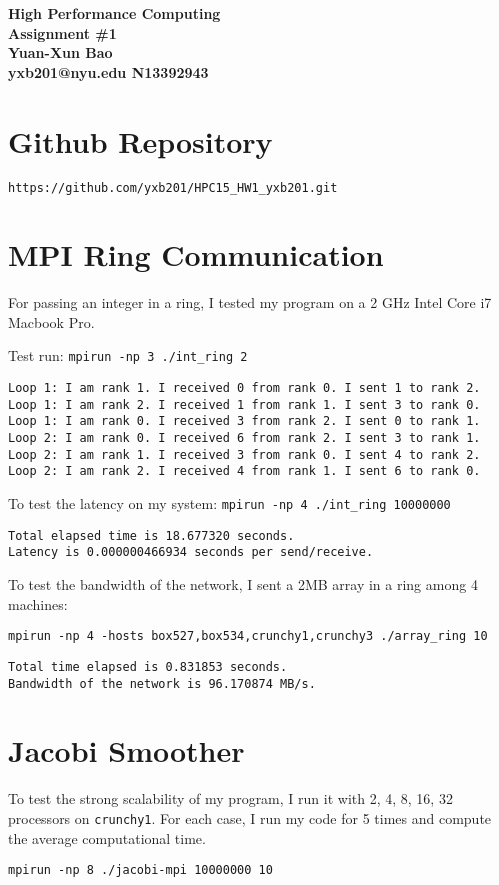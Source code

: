 \documentclass[12pt]{article}
\begin{document}
\begin{center}

\large \textbf{%
High Performance Computing \\ Assignment \#1  \\ Yuan-Xun Bao \\ yxb201@nyu.edu \quad N13392943}
\end{center}

\section{Github Repository}

\verb|https://github.com/yxb201/HPC15_HW1_yxb201.git|

\section{MPI Ring Communication}
For passing an integer in a ring, I tested my program on a 2 GHz Intel Core i7 Macbook Pro.

\noindent
Test run: \verb|mpirun -np 3 ./int_ring 2|

\begin{verbatim}
Loop 1: I am rank 1. I received 0 from rank 0. I sent 1 to rank 2.
Loop 1: I am rank 2. I received 1 from rank 1. I sent 3 to rank 0.
Loop 1: I am rank 0. I received 3 from rank 2. I sent 0 to rank 1.
Loop 2: I am rank 0. I received 6 from rank 2. I sent 3 to rank 1.
Loop 2: I am rank 1. I received 3 from rank 0. I sent 4 to rank 2.
Loop 2: I am rank 2. I received 4 from rank 1. I sent 6 to rank 0.
\end{verbatim}

\noindent
To test the latency on my system: \verb|mpirun -np 4 ./int_ring 10000000|

\begin{verbatim}
Total elapsed time is 18.677320 seconds.
Latency is 0.000000466934 seconds per send/receive.
\end{verbatim}

\noindent
To test the bandwidth of the network, I sent a 2MB array in a ring among 4 machines:

\noindent
\verb|mpirun -np 4 -hosts box527,box534,crunchy1,crunchy3 ./array_ring 10|
\begin{verbatim}
Total time elapsed is 0.831853 seconds.
Bandwidth of the network is 96.170874 MB/s.
\end{verbatim}

\section{Jacobi Smoother}
To test the strong scalability of my program, I run it with 2, 4, 8, 16, 32 processors on \verb|crunchy1|. For each case, I run my code for 5 times and compute the average computational time. 
\begin{verbatim}
mpirun -np 8 ./jacobi-mpi 10000000 10
\end{verbatim}
\end{document}
